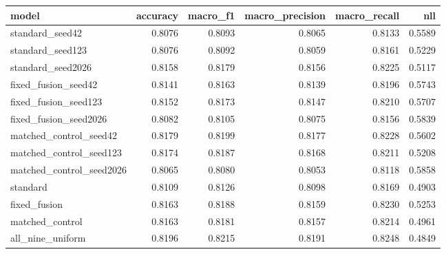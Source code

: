 \begin{tabular}{lrrrrr}
\toprule
model & accuracy & macro\_f1 & macro\_precision & macro\_recall & nll \\
\midrule
standard\_seed42 & 0.8076 & 0.8093 & 0.8065 & 0.8133 & 0.5589 \\
standard\_seed123 & 0.8076 & 0.8092 & 0.8059 & 0.8161 & 0.5229 \\
standard\_seed2026 & 0.8158 & 0.8179 & 0.8156 & 0.8225 & 0.5117 \\
fixed\_fusion\_seed42 & 0.8141 & 0.8163 & 0.8139 & 0.8196 & 0.5743 \\
fixed\_fusion\_seed123 & 0.8152 & 0.8173 & 0.8147 & 0.8210 & 0.5707 \\
fixed\_fusion\_seed2026 & 0.8082 & 0.8105 & 0.8075 & 0.8156 & 0.5839 \\
matched\_control\_seed42 & 0.8179 & 0.8199 & 0.8177 & 0.8228 & 0.5602 \\
matched\_control\_seed123 & 0.8174 & 0.8187 & 0.8168 & 0.8211 & 0.5208 \\
matched\_control\_seed2026 & 0.8065 & 0.8080 & 0.8053 & 0.8118 & 0.5858 \\
standard & 0.8109 & 0.8126 & 0.8098 & 0.8169 & 0.4903 \\
fixed\_fusion & 0.8163 & 0.8188 & 0.8159 & 0.8230 & 0.5253 \\
matched\_control & 0.8163 & 0.8181 & 0.8157 & 0.8214 & 0.4961 \\
all\_nine\_uniform & 0.8196 & 0.8215 & 0.8191 & 0.8248 & 0.4849 \\
\bottomrule
\end{tabular}
